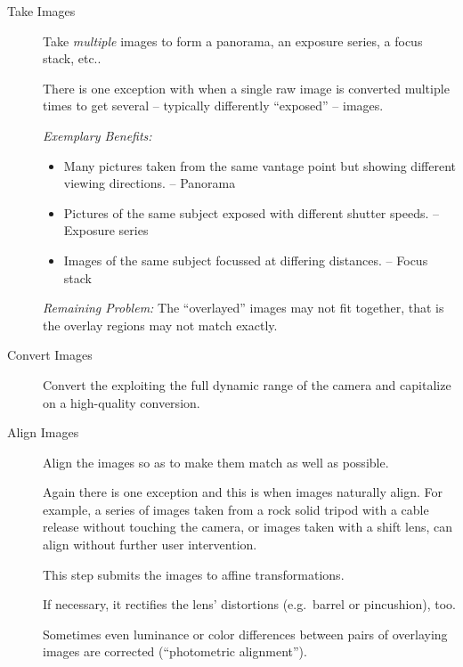 \begin{description}
\item[Take Images]\itemend Take \emph{multiple} images to form a
  panorama, an exposure series, a focus stack, etc..

  There is one exception with  when a single raw
  image is converted multiple times to get several -- typically
  differently ``exposed'' -- images.

  \noindent\emph{Exemplary Benefits:}

  \begin{itemize}
  \item
    Many pictures taken from the same vantage point but showing
    different viewing directions.  -- Panorama

  \item
    Pictures of the same subject exposed with different shutter
    speeds.  -- Exposure series

  \item
    Images of the same subject focussed at differing distances.  --
    Focus stack
  \end{itemize}

  \noindent\emph{Remaining Problem:} The ``overlayed'' images may not
  fit together, that is the overlay regions may not match exactly.

\item[Convert Images]\itemend Convert the
   exploiting the full dynamic range of the
  camera and capitalize on a high-quality conversion.

\item[Align Images]\itemend Align the images so as to make them match
  as well as possible.

  Again there is one exception and this is when images naturally
  align.  For example, a series of images taken from a rock solid
  tripod with a cable release without touching the camera, or images
  taken with a shift lens, can align without further user
  intervention.

  This step submits the images to affine
  transformations.

  If necessary, it rectifies the lens' distortions (e.g.\ barrel or pincushion), too.

  Sometimes even luminance or color differences between pairs of
  overlaying images are corrected (``photometric
  alignment'').


\end{description}
